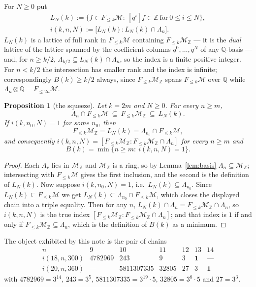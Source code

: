 \documentclass[11pt]{amsart}
\newtheorem{proposition}[theorem]{Proposition}
\theoremstyle{remark}
\newcommand{\Mm}{\mathcal M}
\newcommand{\MZ}{\mathcal M_{\mathbb Z}}
\newcommand{\Lam}{\Lambda}
\begin{document}
For $N\ge0$ put
\[
\begin{gathered}
 L_N(k):=\bigl\{f\in F_{\le k}\Mm:\ [q^i]f\in\mathbb Z\ \text{for}\ 0\le i\le N\bigr\},\\
 i(k,n,N):=\bigl[L_N(k):L_N(k)\cap\Lam_n\bigr].
\end{gathered}
\]
$L_N(k)$ is a lattice of full rank in $F_{\le k}\Mm$ containing $F_{\le k}\MZ$ --- it is the
\emph{dual} lattice of the lattice spanned by the coefficient columns $q^0,\dots,q^N$ of any
$\mathbb Q$-basis --- and, for $n\ge k/2$, $\Lam_{k/2}\subseteq L_N(k)\cap\Lam_n$, so the index is a
finite positive integer. For $n<k/2$ the intersection has smaller rank and the index is infinite;
correspondingly $B(k)\ge k/2$ always, since $F_{\le k}\MZ$ spans $F_{\le k}\Mm$ over $\mathbb Q$
while $\Lam_n\otimes\mathbb Q=F_{\le2n}\Mm$.

\begin{proposition}[the squeeze]\label{prop:squeeze}
Let $k=2m$ and $N\ge0$. For every $n\ge m$,
\[
 \Lam_n\cap F_{\le k}\Mm\ \subseteq\ F_{\le k}\MZ\ \subseteq\ L_N(k).
\]
If $i(k,n_0,N)=1$ for some $n_0$, then
\[
 F_{\le k}\MZ=L_N(k)=\Lam_{n_0}\cap F_{\le k}\Mm,
\]
and consequently $i(k,n,N)=[F_{\le k}\MZ:F_{\le k}\MZ\cap\Lam_n]$ for \emph{every} $n\ge m$ and
\[
 B(k)=\min\{n\ge m:\ i(k,n,N)=1\}.
\]
\end{proposition}

\begin{proof}
Each $A_r$ lies in $\MZ$ and $\MZ$ is a ring, so by Lemma~\ref{lem:basis}
$\Lam_n\subseteq\MZ$; intersecting with $F_{\le k}\Mm$ gives the first inclusion, and the second is
the definition of $L_N(k)$. Now suppose $i(k,n_0,N)=1$, i.e.\ $L_N(k)\subseteq\Lam_{n_0}$. Since
$L_N(k)\subseteq F_{\le k}\Mm$ we get $L_N(k)\subseteq\Lam_{n_0}\cap F_{\le k}\Mm$, which closes the
displayed chain into a triple equality. Then for any $n$,
$L_N(k)\cap\Lam_n=F_{\le k}\MZ\cap\Lam_n$, so $i(k,n,N)$ is the true index
$[F_{\le k}\MZ:F_{\le k}\MZ\cap\Lam_n]$; and that index is $1$ if and only if
$F_{\le k}\MZ\subseteq\Lam_n$, which is the definition of $B(k)$ as a minimum.
\end{proof}

The object exhibited by this note is the pair of chains
\begin{equation}\label{eq:chains}
\begin{array}{c|cccccc}
 n & 9 & 10 & 11 & 12 & 13 & 14\\\hline
 i(18,n,300) & 4782969 & 243 & 9 & 3 & \mathbf 1 & \text{---}\\
 i(20,n,360) & \text{---} & 5811307335 & 32805 & 27 & 3 & \mathbf 1
\end{array}
\end{equation}
with $4782969=3^{14}$, $243=3^5$, $5811307335=3^{19}\cdot5$, $32805=3^{8}\cdot5$ and $27=3^3$.
\end{document}
